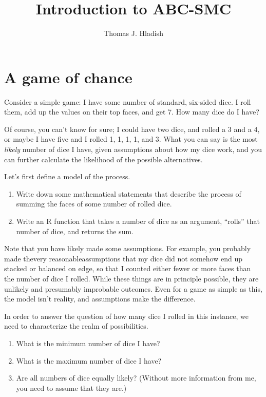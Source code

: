 \documentclass[a4paper,10pt]{article}
\title{Introduction to ABC-SMC}
\author{Thomas J. Hladish}
\begin{document}
\maketitle

\begin{abstract}

\end{abstract}

\section{A game of chance}
Consider a simple game:  I have some number of standard, six-sided dice.  I roll them, add up the values on their top faces, and get 7.  How many dice do I have?

Of course, you can't know for sure; I could have two dice, and rolled a 3 and a 4, or maybe I have five and I rolled 1, 1, 1, 1, and 3.  What you can say is the most \textit{likely} number of dice I have, given assumptions about how my dice work, and you can further calculate the likelihood of the possible alternatives.

Let's first define a model of the process.
\begin{enumerate}
 \item Write down some mathematical statements that describe the process of summing the faces of some number of rolled dice.
 \item Write an R function that takes a number of dice as an argument, ``rolls'' that number of dice, and returns the sum.
\end{enumerate}

Note that you have likely made some assumptions.  For example, you probably made the\textemdash very reasonable\textemdash assumptions that my dice did not somehow end up stacked or balanced on edge, so that I counted either fewer or more faces than the number of dice I rolled.  While these things are in principle possible, they are unlikely and presumably improbable outcomes.  Even for a game as simple as this, the model isn't reality, and assumptions make the difference.

In order to answer the question of how many dice I rolled in this instance, we need to characterize the realm of possibilities.

\begin{enumerate}
 \item What is the minimum number of dice I have?
 \item What is the maximum number of dice I have?
 \item Are all numbers of dice equally likely? (Without more information from me, you need to assume that they are.)
\end{enumerate}
\end{document}
